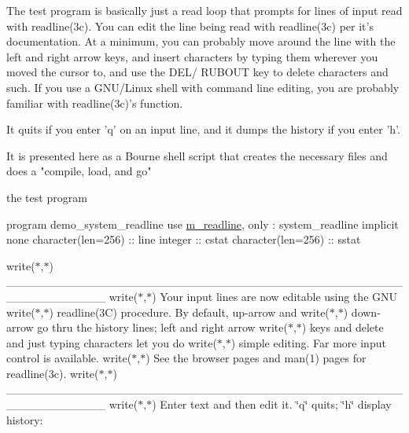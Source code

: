 \begin{DoxyVerb}The test program is basically just a read loop that prompts for
lines of input read with readline(3c). You can edit the line being
read with readline(3c) per it's documentation. At a minimum, you can
probably move around the line with the left and right arrow keys, and
insert characters by typing them wherever you moved the cursor to,
and use the DEL/ RUBOUT key to delete characters and such. If you use
a GNU/Linux shell with command line editing, you are probably familiar
with readline(3c)'s function.

It quits if you enter 'q' on an input line, and it dumps the history if
you enter 'h'.

It is presented here as a Bourne shell script that creates the necessary
files and does a "compile, load, and go"
\end{DoxyVerb}


the test program

program demo\+\_\+system\+\_\+readline use \hyperlink{namespacem__readline}{m\+\_\+readline}, only \+: system\+\_\+readline implicit none character(len=256) \+:\+: line integer \+:\+: cstat character(len=256) \+:\+: sstat

write($\ast$,$\ast$)\textquotesingle{} \+\_\+\+\_\+\+\_\+\+\_\+\+\_\+\+\_\+\+\_\+\+\_\+\+\_\+\+\_\+\+\_\+\+\_\+\+\_\+\+\_\+\+\_\+\+\_\+\+\_\+\+\_\+\+\_\+\+\_\+\+\_\+\+\_\+\+\_\+\+\_\+\+\_\+\+\_\+\+\_\+\+\_\+\+\_\+\+\_\+\+\_\+\+\_\+\+\_\+\+\_\+\+\_\+\+\_\+\+\_\+\+\_\+\+\_\+\+\_\+\+\_\+\+\_\+\+\_\+\+\_\+\+\_\+\+\_\+\+\_\+\+\_\+\+\_\+\+\_\+\+\_\+\+\_\+\+\_\+\+\_\+\+\_\+\+\_\+\+\_\+\+\_\+\+\_\+\+\_\+\textquotesingle{} write($\ast$,$\ast$)\textquotesingle{} Your input lines are now editable using the G\+NU\textquotesingle{} write($\ast$,$\ast$)\textquotesingle{} readline(3\+C) procedure. By default, up-\/arrow and\textquotesingle{} write($\ast$,$\ast$)\textquotesingle{} down-\/arrow go thru the history lines; left and right arrow\textquotesingle{} write($\ast$,$\ast$)\textquotesingle{} keys and delete and just typing characters let you do\textquotesingle{} write($\ast$,$\ast$)\textquotesingle{} simple editing. Far more input control is available.\textquotesingle{} write($\ast$,$\ast$)\textquotesingle{} See the browser pages and man(1) pages for readline(3c).\textquotesingle{} write($\ast$,$\ast$)\textquotesingle{} \+\_\+\+\_\+\+\_\+\+\_\+\+\_\+\+\_\+\+\_\+\+\_\+\+\_\+\+\_\+\+\_\+\+\_\+\+\_\+\+\_\+\+\_\+\+\_\+\+\_\+\+\_\+\+\_\+\+\_\+\+\_\+\+\_\+\+\_\+\+\_\+\+\_\+\+\_\+\+\_\+\+\_\+\+\_\+\+\_\+\+\_\+\+\_\+\+\_\+\+\_\+\+\_\+\+\_\+\+\_\+\+\_\+\+\_\+\+\_\+\+\_\+\+\_\+\+\_\+\+\_\+\+\_\+\+\_\+\+\_\+\+\_\+\+\_\+\+\_\+\+\_\+\+\_\+\+\_\+\+\_\+\+\_\+\+\_\+\+\_\+\+\_\+\+\_\+\+\_\+\textquotesingle{} write($\ast$,$\ast$)\textquotesingle{} Enter text and then edit it. \char`\"{}q\char`\"{} quits; \char`\"{}h\char`\"{} display history\+:\textquotesingle{}

